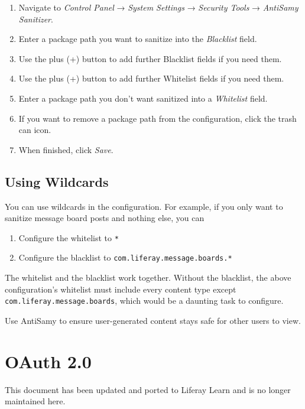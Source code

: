 \begin{enumerate}
\def\labelenumi{\arabic{enumi}.}
\item
  Navigate to \emph{Control Panel} → \emph{System Settings} →
  \emph{Security Tools} → \emph{AntiSamy Sanitizer}.
\item
  Enter a package path you want to sanitize into the \emph{Blacklist}
  field.
\item
  Use the plus (+) button to add further Blacklist fields if you need
  them.
\item
  Use the plus (+) button to add further Whitelist fields if you need
  them.
\item
  Enter a package path you don't want sanitized into a \emph{Whitelist}
  field.
\item
  If you want to remove a package path from the configuration, click the
  trash can icon.
\item
  When finished, click \emph{Save}.
\end{enumerate}

\section{Using Wildcards}\label{using-wildcards}

You can use wildcards in the configuration. For example, if you only
want to sanitize message board posts and nothing else, you can

\begin{enumerate}
\def\labelenumi{\arabic{enumi}.}
\item
  Configure the whitelist to \texttt{*}
\item
  Configure the blacklist to \texttt{com.liferay.message.boards.*}
\end{enumerate}

The whitelist and the blacklist work together. Without the blacklist,
the above configuration's whitelist must include every content type
except \texttt{com.liferay.message.boards}, which would be a daunting
task to configure.

Use AntiSamy to ensure user-generated content stays safe for other users
to view.

\chapter{OAuth 2.0}\label{oauth-2.0}

{This document has been updated and ported to Liferay Learn and is no
longer maintained here.}

